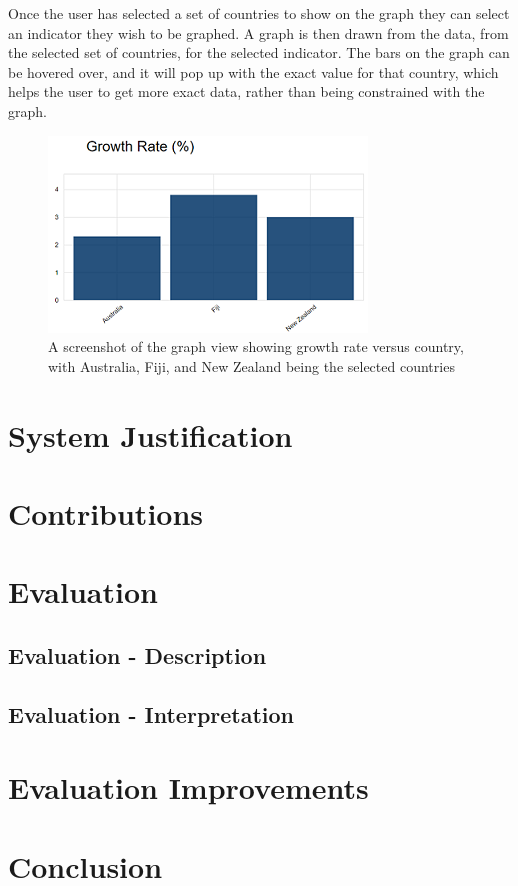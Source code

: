\documentclass[10pt, journal]{IEEEtran}
\begin{document}
Once the user has selected a set of countries to show on the graph they can select an indicator they wish to be graphed. A graph is then drawn from the data, from the selected set of countries, for the selected indicator. The bars on the graph can be hovered over, and it will pop up with the exact value for that country, which helps the user to get more exact data, rather than being constrained with the graph.

\begin{figure}[h]
\includegraphics{graph.png}
\caption{A screenshot of the graph view showing growth rate versus country, with Australia, Fiji, and New Zealand being the selected countries}
\end{figure}
 
\section{System Justification}

\section{Contributions}

\section{Evaluation}

\subsection{Evaluation - Description}

\subsection{Evaluation - Interpretation}

\section{Evaluation Improvements}

\section{Conclusion}


\nocite{*}



\end{document}
